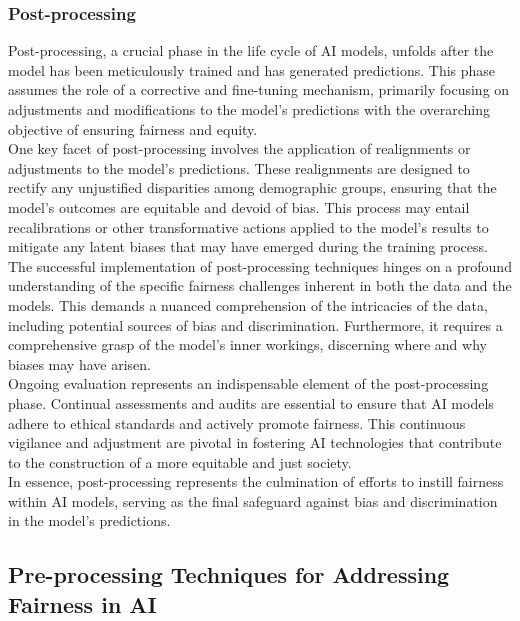 \documentclass[12pt,a4paper,openright,twoside]{book}
\begin{document}
\subsubsection{Post-processing}
Post-processing, a crucial phase in the life cycle of AI models, unfolds after the model has been meticulously trained and has generated predictions. This phase assumes the role of a corrective and fine-tuning mechanism, primarily focusing on adjustments and modifications to the model's predictions with the overarching objective of ensuring fairness and equity. \\
One key facet of post-processing involves the application of realignments or adjustments to the model's predictions. These realignments are designed to rectify any unjustified disparities among demographic groups, ensuring that the model's outcomes are equitable and devoid of bias. This process may entail recalibrations or other transformative actions applied to the model's results to mitigate any latent biases that may have emerged during the training process. \\
The successful implementation of post-processing techniques hinges on a profound understanding of the specific fairness challenges inherent in both the data and the models. This demands a nuanced comprehension of the intricacies of the data, including potential sources of bias and discrimination. Furthermore, it requires a comprehensive grasp of the model's inner workings, discerning where and why biases may have arisen. \\
Ongoing evaluation represents an indispensable element of the post-processing phase. Continual assessments and audits are essential to ensure that AI models adhere to ethical standards and actively promote fairness. This continuous vigilance and adjustment are pivotal in fostering AI technologies that contribute to the construction of a more equitable and just society. \\
In essence, post-processing represents the culmination of efforts to instill fairness within AI models, serving as the final safeguard against bias and discrimination in the model's predictions.

\subsection{Pre-processing Techniques for Addressing Fairness in AI}
\end{document}
